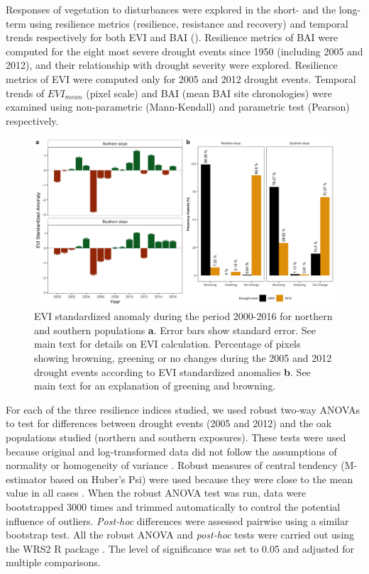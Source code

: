 Responses of vegetation to disturbances were explored in the short- and the long-term using resilience metrics (resilience, resistance and recovery) and temporal trends respectively for both EVI and BAI (). Resilience metrics of BAI were computed for the eight most severe drought events since 1950 (including 2005 and 2012), and their relationship with drought severity were explored. Resilience metrics of EVI were computed only for 2005 and 2012 drought events. Temporal trends of \(EVI_{mean}\) (pixel scale) and BAI (mean BAI site chronologies) were examined using non-parametric (Mann-Kendall) and parametric test (Pearson) respectively.

\begin{figure}
\centering
\includegraphics[width=\textwidth]{img/dendro/dendro-evisa.jpg} \caption{EVI standardized anomaly during the period 2000-2016 for northern and southern populations \textbf{a}. Error bars show standard error. See main text for details on EVI calculation. Percentage of pixels showing browning, greening or no changes during the 2005 and 2012 drought events according to EVI standardized anomalies \textbf{b}. See main text for an explanation of greening and browning.}
\label{fig:dendro:evisa}
\end{figure}

For each of the three resilience indices studied, we used robust two-way ANOVAs to test for differences between drought events (2005 and 2012) and the oak populations studied (northern and southern exposures). These tests were used because original and log-transformed data did not follow the assumptions of normality or homogeneity of variance \autocite{Wilcox2012IntroductionRobust}. Robust measures of central tendency (M-estimator based on Huber's Psi) were used because they were close to the mean value in all cases \autocite{Wilcox2012IntroductionRobust}. When the robust ANOVA test was run, data were bootstrapped 3000 times and trimmed automatically to control the potential influence of outliers. \emph{Post-hoc} differences were assessed pairwise using a similar bootstrap test. All the robust ANOVA and \emph{post-hoc} tests were carried out using the WRS2 R package \autocite{Mairetal2017WRS2Wilcox}. The level of significance was set to 0.05 and adjusted for multiple comparisons.

